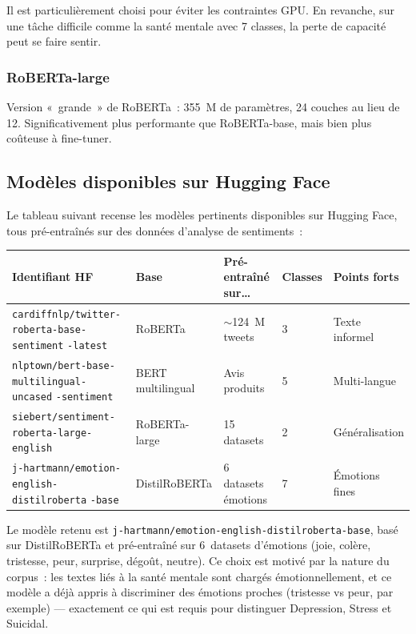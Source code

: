 \documentclass[12pt,a4paper]{report}
\begin{document}
Il est particulièrement choisi pour éviter les contraintes GPU. En revanche, sur une
tâche difficile comme la santé mentale avec 7 classes, la perte de capacité peut se
faire sentir.

\subsubsection{RoBERTa-large}

Version «~grande~» de RoBERTa~: 355~M de paramètres, 24 couches au lieu de 12.
Significativement plus performante que RoBERTa-base, mais bien plus coûteuse à
fine-tuner.

\subsection{Modèles disponibles sur Hugging Face}

Le tableau suivant recense les modèles pertinents disponibles sur Hugging Face, tous
pré-entraînés sur des données d'analyse de sentiments~:

\begin{center}
\begin{tabular}{@{}L{4.5cm}C{2cm}C{3.2cm}C{0.8cm}C{2cm}@{}}
  \toprule
  Identifiant HF & Base & Pré-entraîné sur\dots & Classes & Points forts \\
  \midrule
  \texttt{cardiffnlp/twitter-} \newline \texttt{roberta-base-sentiment} \newline \texttt{-latest} & RoBERTa & $\sim$124~M tweets & 3 & Texte informel \\
  \texttt{nlptown/bert-base-} \newline \texttt{multilingual-uncased} \newline \texttt{-sentiment} & BERT multilingual & Avis produits & 5 & Multi-langue \\
  \texttt{siebert/sentiment-} \newline \texttt{roberta-large-english} & RoBERTa-large & 15 datasets & 2 & Généralisation \\
  \texttt{j-hartmann/emotion-} \newline \texttt{english-distilroberta} \newline \texttt{-base} & DistilRoBERTa & 6 datasets émotions & 7 & Émotions fines \\
  \bottomrule
\end{tabular}
\end{center}

\begin{note}
Le modèle retenu est \texttt{j-hartmann/emotion-english-distilroberta-base}, basé sur
DistilRoBERTa et pré-entraîné sur 6~datasets d'émotions (joie, colère, tristesse, peur,
surprise, dégoût, neutre). Ce choix est motivé par la nature du corpus~: les textes liés
à la santé mentale sont chargés émotionnellement, et ce modèle a déjà appris à
discriminer des émotions proches (tristesse vs peur, par exemple) — exactement ce qui
est requis pour distinguer Depression, Stress et Suicidal.
\end{note}
\end{document}

